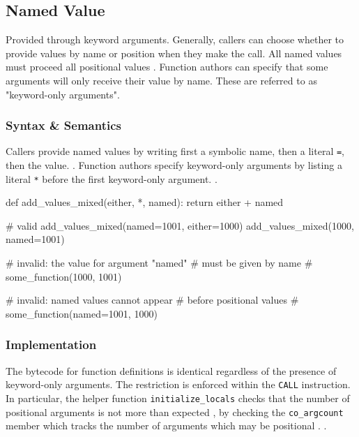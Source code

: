 \subsection{Named Value}
Provided through keyword arguments.
Generally, callers can choose whether to provide values by name or position when they
make the call.
All named values must proceed all positional values
\parencite[][reference/expressions.html section 6.3.4 "Calls"]{python-doc-html}.
Function authors can specify that some arguments will only receive their value by name.
These are referred to as "keyword-only arguments".

\subsubsection{Syntax \& Semantics}
Callers provide named values by writing first a symbolic name, then a literal \texttt{=},
then the value.
\parencite[][reference/expressions.html section 6.3.4 "Calls"]{python-doc-html}.
Function authors specify keyword-only arguments by listing a literal \texttt{*} before the
first keyword-only argument.
\parencite[][reference/compound\_stmts.html section 8.7 "Function Definitions"]{python-doc-html}.

\begin{pygmented}[lang=python]
def add_values_mixed(either, *, named):
    return either + named

# valid
add_values_mixed(named=1001, either=1000)
add_values_mixed(1000, named=1001)

# invalid: the value for argument "named"
# must be given by name
# some_function(1000, 1001)

# invalid: named values cannot appear
# before positional values
# some_function(named=1001, 1000)
\end{pygmented}

\subsubsection{Implementation}
The bytecode for function definitions is identical regardless of the presence of
keyword-only arguments.
The restriction is enforced within the \texttt{CALL} instruction.
In particular, the helper function \texttt{initialize\_locals} checks that the number of
positional arguments is not more than expected
\parencite[][Python/ceval.c lines 1458-1462, trace\_call\_TO\_initialize\_locals]{python-doc-html},
by checking the \texttt{co\_argcount} member which tracks the number of arguments which
may be positional
\parencite[][Doc/library/inspect.rst lines 146-149]{python-source}.
\parencite[][Python/assemble.c line 556]{python-source}.

